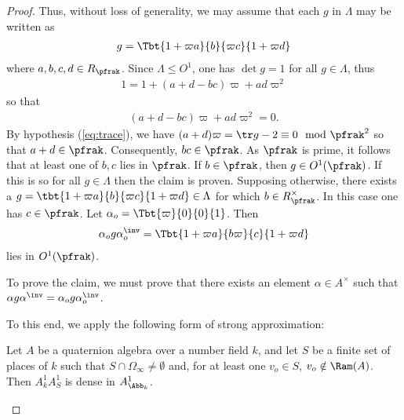 \begin{proof}
	Thus, without loss of generality, we may assume that each $g$ in $\Lambda$ may be written as
	\begin{align*}
		g = \Tbt{1+\varpi a}{b}{\varpi c}{1+\varpi d}
	\end{align*}
	where $a,b,c,d \in R_\pfrak$.
	Since $\Lambda \leq O^1$, one has $\det g = 1 $ for all $g\in \Lambda$, thus
	\begin{align*}
		1 = 1 + (a+d - bc) \varpi + ad \varpi^2
	\end{align*}
	so that
	\begin{align}\label{eq:MandarinLeyden}
		(a+d - bc) \varpi + ad \varpi^2 =0.
	\end{align}
	By hypothesis (\ref{eq:trace}), we have $(a+d)\varpi = \tr g -2 \equiv 0 \mod \pfrak^2$ so that $a+d \in \pfrak$. Consequently, $bc \in \pfrak$. As $\pfrak$ is prime, it follows that at least one of $b,c$ lies in $\pfrak$. If $b \in \pfrak$, then $g \in O^1(\pfrak)$. If this is so for all $g \in \Lambda$ then the claim is proven. Supposing otherwise, there exists a $g=\tbt{1+\varpi a}{b}{\varpi c}{1+\varpi d} \in \Lambda$ for which $b \in R_\pfrak^\times$. In this case one has $c \in \pfrak$. Let $\alpha_o = \Tbt{\varpi}{0}{0}{1}$. Then
	\begin{align*}
		\alpha_o g\alpha_o^\inv  = \Tbt{1+\varpi a}{b\varpi}{c}{1+\varpi d}
	\end{align*}
	lies in $O^1(\pfrak)$.

	To prove the claim, we must prove that there exists an element $\alpha \in A^\times $ such that $\alpha g \alpha^\inv =  \alpha_o g \alpha_o^\inv$.

	To this end, we apply the following form of strong approximation:
	\begin{proposition}
		Let $A$ be a quaternion algebra over a number field $k$, and let $S$ be a finite set of places of $k$ such that $S\cap \Omega_\infty \neq \emptyset$ and, for at least one $v_o \in S$, $v_o \notin \Ram(A)$. Then $A^1_k A^1_S $ is dense in $A^1_{\Abb_k}$.
	\end{proposition}













\end{proof}